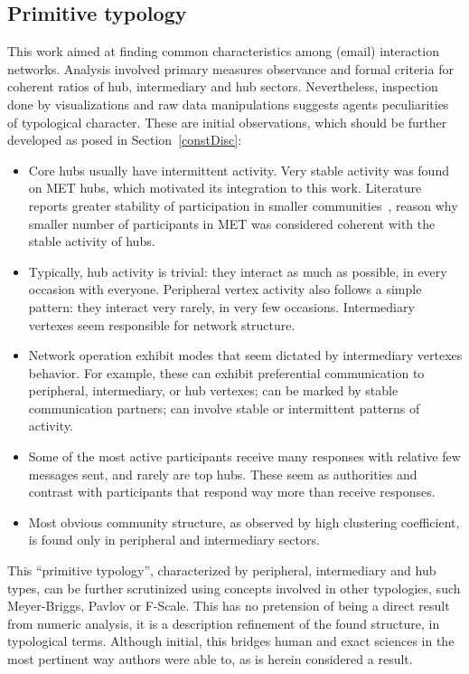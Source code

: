 \documentclass[%
 aip,
 jmp,%
 amsmath,amssymb,
 reprint,%
]{revtex4-1}
\begin{document}
    \subsection{Primitive typology}

This work aimed at finding common characteristics among (email) interaction networks. Analysis involved primary measures observance and formal criteria for coherent ratios of hub, intermediary and hub sectors. Nevertheless, inspection done by visualizations and raw data manipulations suggests agents peculiarities of typological character. These are initial observations, which should be further developed as posed in Section~\ref{constDisc}:

\begin{itemize}
    \item Core hubs usually have intermittent activity. Very stable activity was found on MET hubs, which motivated its integration to this work. Literature reports greater stability of participation in smaller communities~\cite{barabasiEvo}, reason why smaller number of participants in MET was considered coherent with the stable activity of hubs.
    \item Typically, hub activity is trivial: they interact as much as possible, in every occasion with everyone. Peripheral vertex activity also follows a simple pattern: they interact very rarely, in very few occasions. Intermediary vertexes seem responsible for network structure.
    \item Network operation exhibit modes that seem dictated by intermediary vertexes behavior. For example, these can exhibit preferential communication to peripheral, intermediary, or hub vertexes; can be marked by stable communication partners; can involve stable or intermittent patterns of activity.
    \item Some of the most active participants receive many responses with relative few messages sent, and rarely are top hubs. These seem as authorities and contrast with participants that respond way more than receive responses.
    \item Most obvious community structure, as observed by high clustering coefficient, is found only in peripheral and intermediary sectors.
\end{itemize}

This ``primitive typology'', characterized by peripheral, intermediary and hub types, can be further scrutinized using concepts involved in other typologies, such Meyer-Briggs, Pavlov or F-Scale. This has no pretension of being a direct result from numeric analysis, it is a description refinement of the found structure, in typological terms. Although initial, this bridges human and exact sciences in the most pertinent way authors were able to, as is herein considered a result.
\end{document}
